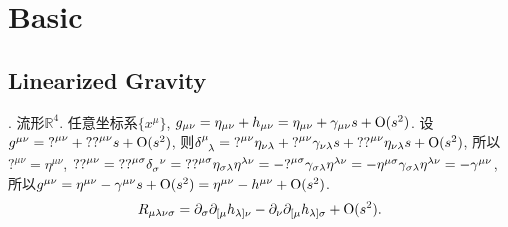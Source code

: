 \chapter{Basic}\label{basic}

\section{Linearized Gravity}\label{linearized_gravity}

\cite{Wald1984,Flanagan2005,Hughes2009,Maggiore2014}. 流形$\mathbb{R}^{4}$. 任意坐标系$\{x^{\mu}\}$, $g_{\mu\nu}=\eta_{\mu\nu}+h_{\mu\nu}=\eta_{\mu\nu}+\gamma_{\mu\nu}s+\text{O}(s^2)$. 设$g^{\mu\nu}={?}^{\mu\nu}+{??}^{\mu\nu}s+\text{O}(s^2)$, 则$\delta^{\mu}_{\ph{\mu}\lambda}={?}^{\mu\nu}\eta_{\nu\lambda}+{?}^{\mu\nu}\gamma_{\nu\lambda}s+{??}^{\mu\nu}\eta_{\nu\lambda}s+\t{O}(s^2)$, 所以${?}^{\mu\nu}=\eta^{\mu\nu}$, ${??}^{\mu\nu}={??}^{\mu\sigma}\delta_{\sigma}^{\ph{\sigma}\nu}={??}^{\mu\sigma}\eta_{\sigma\lambda}\eta^{\lambda\nu}=-{?}^{\mu\sigma}\gamma_{\sigma\lambda}\eta^{\lambda\nu}=-\eta^{\mu\sigma}\gamma_{\sigma\lambda}\eta^{\lambda\nu}=-\gamma^{\mu\nu}$, 所以$g^{\mu\nu}=\eta^{\mu\nu}-\gamma^{\mu\nu}s+\text{O}(s^2)=\eta^{\mu\nu}-h^{\mu\nu}+\text{O}(s^2)$.
\begin{equation}
    R_{\mu\lambda\nu\sigma}=\partial_\sigma\partial_{[\mu}h_{\lambda]\nu}-\partial_\nu\partial_{[\mu}h_{\lambda]\sigma}+\text{O}(s^2).
\end{equation}

